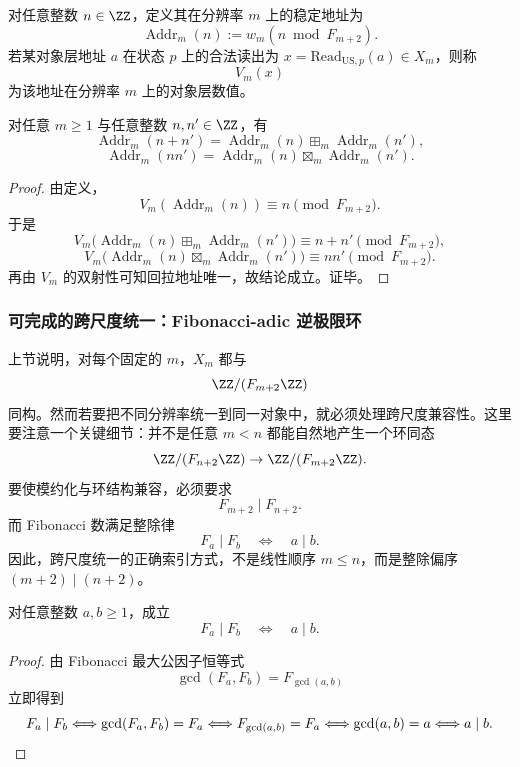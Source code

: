\begin{definition}[稳定地址的数值化]
对任意整数 \(n\in \ZZ\)，定义其在分辨率 \(m\) 上的稳定地址为
\[
\operatorname{Addr}_m(n):=w_m(n\bmod F_{m+2}).
\]
若某对象层地址 \(a\) 在状态 \(p\) 上的合法读出为 \(x=\mathrm{Read}_{\mathrm{US},p}(a)\in X_m\)，则称
\[
V_m(x)
\]
为该地址在分辨率 \(m\) 上的对象层数值。
\end{definition}

\begin{proposition}[数值化的自然性]
对任意 \(m\ge 1\) 与任意整数 \(n,n'\in \ZZ\)，有
\[
\operatorname{Addr}_m(n+n')
=
\operatorname{Addr}_m(n)\boxplus_m \operatorname{Addr}_m(n'),
\]
\[
\operatorname{Addr}_m(nn')
=
\operatorname{Addr}_m(n)\boxtimes_m \operatorname{Addr}_m(n').
\]
\end{proposition}
\begin{proof}
由定义，
\[
V_m(\operatorname{Addr}_m(n))
\equiv n \pmod{F_{m+2}}.
\]
于是
\[
V_m\bigl(\operatorname{Addr}_m(n)\boxplus_m \operatorname{Addr}_m(n')\bigr)
\equiv n+n' \pmod{F_{m+2}},
\]
\[
V_m\bigl(\operatorname{Addr}_m(n)\boxtimes_m \operatorname{Addr}_m(n')\bigr)
\equiv nn' \pmod{F_{m+2}}.
\]
再由 \(V_m\) 的双射性可知回拉地址唯一，故结论成立。证毕。
\end{proof}

\subsubsection{可完成的跨尺度统一：Fibonacci-adic 逆极限环}\label{subsubsec:fib-adic-inverse-limit}

上节说明，对每个固定的 \(m\)，\(X_m\) 都与
\[
\ZZ/(F_{m+2}\ZZ)
\]
同构。然而若要把不同分辨率统一到同一对象中，就必须处理跨尺度兼容性。这里要注意一个关键细节：并不是任意 \(m<n\) 都能自然地产生一个环同态
\[
\ZZ/(F_{n+2}\ZZ)\to \ZZ/(F_{m+2}\ZZ).
\]
要使模约化与环结构兼容，必须要求
\[
F_{m+2}\mid F_{n+2}.
\]
而 Fibonacci 数满足整除律
\[
F_a\mid F_b \quad\Longleftrightarrow\quad a\mid b.
\]
因此，跨尺度统一的正确索引方式，不是线性顺序 \(m\le n\)，而是整除偏序 \((m+2)\mid (n+2)\)。

\begin{lemma}\label{lem:fib-divisibility-iff}
对任意整数 \(a,b\ge 1\)，成立
\[
F_a\mid F_b\quad\Longleftrightarrow\quad a\mid b.
\]
\end{lemma}
\begin{proof}
由 Fibonacci 最大公因子恒等式
\[
\gcd(F_a,F_b)=F_{\gcd(a,b)}
\]
立即得到
\[
F_a\mid F_b
\Longleftrightarrow
\gcd(F_a,F_b)=F_a
\Longleftrightarrow
F_{\gcd(a,b)}=F_a
\Longleftrightarrow
\gcd(a,b)=a
\Longleftrightarrow
a\mid b.
\qedhere
\]
\end{proof}

